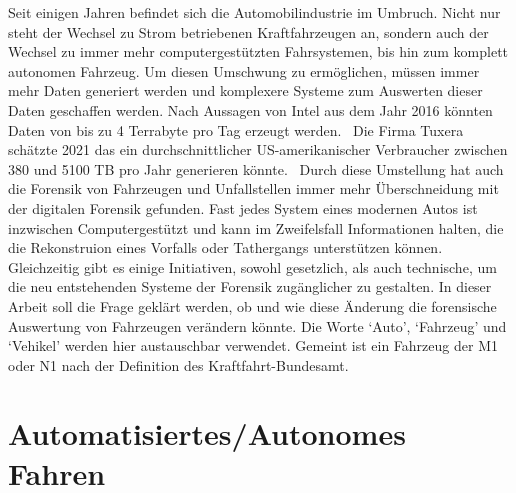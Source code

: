 \documentclass[conference,compsoc,final,a4paper]{IEEEtran}
\begin{document}
Seit einigen Jahren befindet sich die Automobilindustrie im Umbruch. Nicht nur steht der Wechsel zu Strom betriebenen Kraftfahrzeugen an,
sondern auch der Wechsel zu immer mehr computergestützten Fahrsystemen, bis hin zum komplett autonomen Fahrzeug.
Um diesen Umschwung zu ermöglichen, müssen immer mehr Daten generiert werden und komplexere Systeme zum Auswerten dieser Daten geschaffen werden.
Nach Aussagen von Intel aus dem Jahr 2016 könnten Daten von bis zu 4 Terrabyte pro Tag erzeugt werden.~\cite{Nelson2016}
Die Firma Tuxera schätzte 2021 das ein durchschnittlicher US-amerikanischer Verbraucher zwischen 380 und 5100 TB pro Jahr generieren könnte.~\cite{Wright2021}
Durch diese Umstellung hat auch die Forensik von Fahrzeugen und Unfallstellen immer mehr Überschneidung mit der digitalen Forensik gefunden.
Fast jedes System eines modernen Autos ist inzwischen Computergestützt und kann im Zweifelsfall Informationen halten, die die Rekonstruion eines Vorfalls oder Tathergangs unterstützen können.
Gleichzeitig gibt es einige Initiativen, sowohl gesetzlich\cite{Boehm2020}, als auch technische\cite{Hoque_2021a}\cite{Lee_2019}, um die neu entstehenden Systeme der Forensik zugänglicher zu gestalten.
In dieser Arbeit soll die Frage geklärt werden, ob und wie diese Änderung die forensische Auswertung von Fahrzeugen verändern könnte.
Die Worte `Auto', `Fahrzeug' und `Vehikel' werden hier austauschbar verwendet. Gemeint ist ein Fahrzeug der M1 oder N1 nach der Definition des Kraftfahrt-Bundesamt.

\section{Automatisiertes/Autonomes Fahren}
\end{document}

